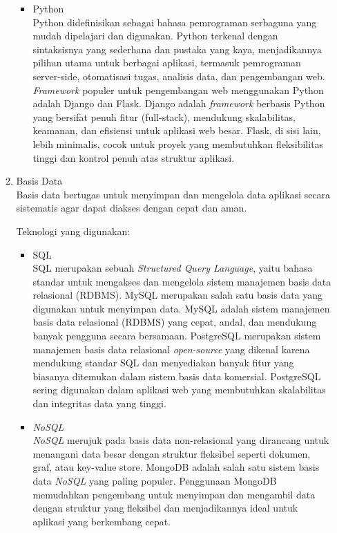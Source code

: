 \begin{enumerate}[label*=\arabic*.,ref=\arabic*]
\begin{enumerate}[label=\alph*.]
\begin{itemize}
                    \item Python\\
                        Python didefinisikan sebagai bahasa pemrograman serbaguna yang mudah dipelajari dan digunakan. Python terkenal dengan sintaksisnya yang sederhana dan pustaka yang kaya, menjadikannya pilihan utama untuk berbagai aplikasi, termasuk pemrograman server-side, otomatisasi tugas, analisis data, dan pengembangan web.
                        \textit{Framework} populer untuk pengembangan web menggunakan Python adalah Django dan Flask. Django adalah\textit{ framework} berbasis Python yang bersifat penuh fitur (full-stack), mendukung skalabilitas, keamanan, dan efisiensi untuk aplikasi web besar. Flask, di sisi lain, lebih minimalis, cocok untuk proyek yang membutuhkan fleksibilitas tinggi dan kontrol penuh atas struktur aplikasi.
                \end{itemize}
            
            \item Basis Data\\
                Basis data bertugas untuk menyimpan dan mengelola data aplikasi secara sistematis agar dapat diakses dengan cepat dan aman.
                
                Teknologi yang digunakan:
                \begin{itemize}
                    \item SQL\\
                        SQL merupakan sebuah \textit{Structured Query Language}, yaitu bahasa standar untuk mengakses dan mengelola sistem manajemen basis data relasional (RDBMS). 
                        MySQL merupakan salah satu basis data yang digunakan untuk menyimpan data. MySQL adalah sistem manajemen basis data relasional (RDBMS) yang cepat, andal, dan mendukung banyak pengguna secara bersamaan. PostgreSQL merupakan sistem manajemen basis data relasional \textit{open-source} yang dikenal karena mendukung standar SQL dan menyediakan banyak fitur yang biasanya ditemukan dalam sistem basis data komersial. PostgreSQL sering digunakan dalam aplikasi web yang membutuhkan skalabilitas dan integritas data yang tinggi.
                    \item \textit{NoSQL}\\
                        \textit{NoSQL} merujuk pada basis data non-relasional yang dirancang untuk menangani data besar dengan struktur fleksibel seperti dokumen, graf, atau key-value store. MongoDB adalah salah satu sistem basis data \textit{NoSQL} yang paling populer. Penggunaan MongoDB memudahkan pengembang untuk menyimpan dan mengambil data dengan struktur yang fleksibel dan menjadikannya ideal untuk aplikasi yang berkembang cepat. 
                \end{itemize}
                

\end{enumerate}
\end{enumerate}
